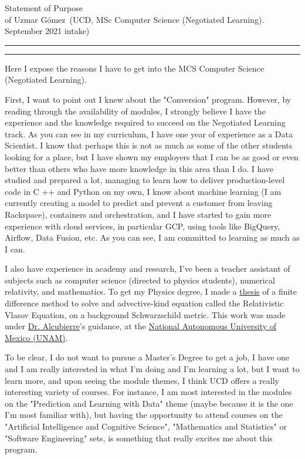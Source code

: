 \documentclass{article}
\newcommand{\soptitle}{Statement of Purpose}
\newcommand{\yourname}{Uzmar G\'omez}
\begin{document}
\begin{center}\LARGE\soptitle\\
\large of \yourname\ (UCD, MSc Computer Science (Negotiated Learning). September 2021 intake)
\end{center}

\hrule
\vspace{1pt}
\hrule height 1pt

\bigskip

Here I expose the reasons I have to get into the MCS Computer Science (Negotiated Learning).

First, I want to point out I knew about the "Conversion" program. However, by reading through the availability of modules, I strongly believe I have the experience and the knowledge required to succeed on the Negotiated Learning track. As you can see in my curriculum,  I have one year of experience as a Data Scientist. I know that perhaps this is not as much as some of the other students looking for a place, but I have shown my employers that I can be as good or even better than others who have more knowledge in this area than I do. I have studied and prepared a lot, managing to learn how to deliver production-level code in C ++ and Python on my own, I know about machine learning (I am currently creating a model to predict and prevent a customer from leaving Rackspace), containers and orchestration, and I have started to gain more experience with cloud services, in particular GCP, using tools like BigQuery, Airflow, Data Fusion, etc. As you can see, I am committed to learning as much as I can.

I also have experience in academy and research, I've been a teacher assistant of subjects such as computer science (directed to physics students), numerical relativity, and mathematics. To get my Physics degree, I made a \href{http://oreon.dgbiblio.unam.mx/F/YF3LAD8UIUFR2XRPDE3H6JM2MI44M8RY8QX1RH7K429163KKEV-19694?func=find-b&request=uzmar&find_code=WRD&adjacent=N&local_base=TES01&x=65&y=13&filter_code_2=WYR&filter_request_2=&filter_code_3=WYR&filter_request_3=}{thesis} of a finite difference method to solve and advective-kind equation called the Relativistic Vlasov Equation, on a background Schwarzschild metric. This work was made under \href{https://sigi.nucleares.unam.mx/sgiicn/people/user/view/id/8}{Dr. Alcubierre}'s guidance, at the \href{https://www.unam.mx/}{National Autonomous University of Mexico (UNAM)}.

To be clear, I do not want to pursue a Master's Degree to get a job, I have one and I am really interested in what I'm doing and I'm learning a lot, but I want to learn more, and upon seeing the module themes, I think UCD offers a really interesting variety of courses. For instance, I am most interested in the modules on the "Prediction and Learning with Data" theme (maybe because it is the one I'm most familiar with), but having the opportunity to attend courses on the "Artificial Intelligence and Cognitive Science", "Mathematics and Statistics" or "Software Engineering" sets, is something that really excites me about this program.
\end{document}
